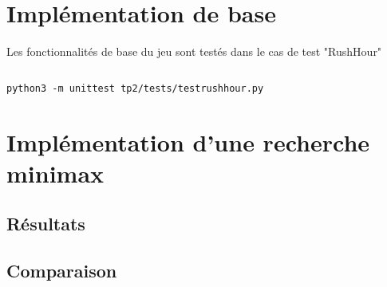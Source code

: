 \documentclass{article}
\begin{document}
    

    \section{Implémentation de base}

    Les fonctionnalités de base du jeu sont testés dans le cas de test "RushHour"
    \begin{lstlisting}
    \end{lstlisting}
    \texttt{python3 -m unittest tp2/tests/testrushhour.py}
    \section{Implémentation d'une recherche minimax}

    \subsection{Résultats}
    \subsection{Comparaison}
\end{document}

